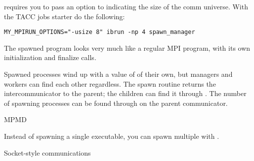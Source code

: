 \begin{taccnote}
 requires you to pass an option  to
 indicating the size of the comm universe. With the TACC
jobs starter  do the following:
\begin{verbatim}
MY_MPIRUN_OPTIONS="-usize 8" ibrun -np 4 spawn_manager
\end{verbatim}
\end{taccnote}
The spawned program looks very much like a regular MPI program, with
its own initialization and finalize calls.

%

Spawned processes wind up with a value of  of their
own, but managers and workers can find each other regardless.
The spawn routine returns the intercommunicator to the parent; the children
can find it through . The number of
spawning processes can be found through
 on the parent communicator.


 {MPMD}

Instead of spawning a single executable, you can spawn multiple with
.

 {Socket-style communications}



